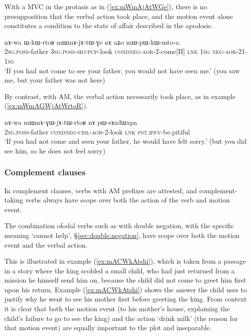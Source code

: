 With a MVC in the protasis as in (\ref{ex:mWmAjAtWGe}), there is no presupposition that the verbal action took place, and the motion event alone constitutes a condition to the state of affair described in the apodosis.

\begin{exe}
\ex \label{ex:mWmAjAtWGe}
\gll nɤ-wa ɯ-kɯ-rtoʁ mɯ\redp{}mɤ-jɤ-tɯ-ɣe nɤ aʑo mɯ-pɯ-kɯ-mto-a. \\
\textsc{2sg}.\textsc{poss}-father \textsc{3sg}.\textsc{poss}-\textsc{sbj}:\textsc{pcp}-look \textsc{cond}\redp{}\textsc{neg}-\textsc{aor}-2-come[II] \textsc{lnk} \textsc{1sg} \textsc{neg}-\textsc{aor}-2\fl{}1-\textsc{1sg} \\
\glt `If you had not come to see your father, you would not have seen me.' (you saw me, but your father was not here)
\end{exe}

By contrast, with AM, the verbal action necessarily took place, as in example (\ref{ex:mWmAGWjAtWrtoR}).

\begin{exe}
\ex \label{ex:mWmAGWjAtWrtoR}
\gll nɤ-wa  mɯ\redp{}mɤ-ɣɯ-jɤ-tɯ-rtoʁ nɤ pɯ-sɤzdɯxpa \\
\textsc{2sg}.\textsc{poss}-father \textsc{cond}\redp{}\textsc{neg}-\textsc{cisl}-\textsc{aor}-2-look \textsc{lnk} \textsc{pst}.\textsc{ipfv}-be.pitiful \\ 
\glt `If you had not come and seen your father, he would have felt sorry.' (but you did see him, so he does not feel sorry)
\end{exe}

\subsubsection{Complement clauses} \label{sec:am.complement}
In complement clauses, verbs with AM prefixes are attested, and complement-taking verbs always have scope over both the action of the verb and motion event.

The combination ofodal verbs such as  with double negation, with the specific meaning `cannot help', §\ref{sec:double.negation}, have scope over both the motion event and the verbal action. 

This is illustrated in example (\ref{ex:mACWkAtshi}), which is taken from a passage in a story where the king scolded a small child, who had just returned from a mission he himself send him on, because the child did not come to greet him first upon his return. Example (\ref{ex:mACWkAtshi}) shows the answer the child uses to justify why he went to see his mother first before greeting the king. From  context it is clear that both the motion event (to his mother's house, explaining the child's failure to go to see the king) and the action `drink milk' (the reason for that motion event) are equally important to the plot and inseparable. 

